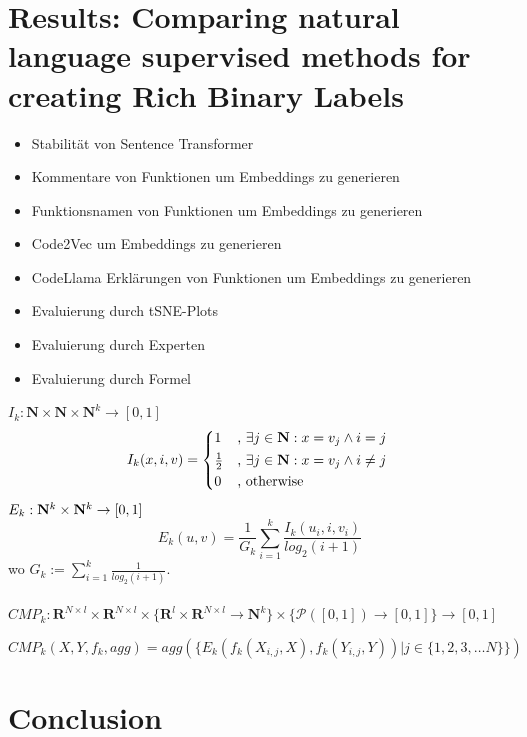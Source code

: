 \documentclass[12pt,letterpaper,ngerman]{article}
\begin{document}
\section{Results: Comparing natural language supervised methods for creating Rich Binary Labels}
\begin{itemize}
  \item Stabilität von Sentence Transformer
  \item Kommentare von Funktionen um Embeddings zu generieren
  \item Funktionsnamen von Funktionen um Embeddings zu generieren
  \item Code2Vec um Embeddings zu generieren
  \item CodeLlama Erklärungen von Funktionen um Embeddings zu generieren
  \item Evaluierung durch tSNE-Plots
  \item Evaluierung durch Experten
  \item Evaluierung durch Formel
\end{itemize}
$ I_{k}: \mathbf{N} \times \mathbf{N} \times \mathbf{N}^{k} \to [0,1]$
\[ I_{k}(x,i,v) = \begin{cases*} 
      1 & , $\exists j \in \mathbf{N}: x = v_j \land i = j$  \\
      \frac{1}{2} & , $\exists j \in \mathbf{N}: x = v_j \land i \neq j$\\
      0   & , \text{otherwise}
                \end{cases*} \]
$E_k: \mathbf{N}^k \times \mathbf{N}^k \to [0,1]$
\[ E_k(u,v) = \frac{1}{G_k} \sum^{k}_{i=1} \frac{I_k(u_i,i,v_i)}{log_2(i+1)}\]
wo $G_k := \sum_{i=1}^{k} \frac{1}{log_2(i+1)}$.\\\\
$CMP_k: \mathbf{R}^{N\times l} \times \mathbf{R}^{N\times l} \times 
\{ \mathbf{R}^l \times \mathbf{R}^{N\times l} \to \mathbf{N}^k \} 
\times \{ \mathcal{P}([0,1]) \to [0,1] \} \to [0,1]$

\[ CMP_k(X,Y,f_k,agg) = agg(\{E_k(f_k(X_{i,j},X),f_k(Y_{i,j},Y)) | j \in \{1,2,3, \dots N\}\})\]


\section{Conclusion}

\pagebreak



\pagebreak

\listoffigures{}
\listoftables{}

\clearpage
\printglossaries

\pagebreak

\pagestyle{fancy}



\nocite{*} %
\end{document}
